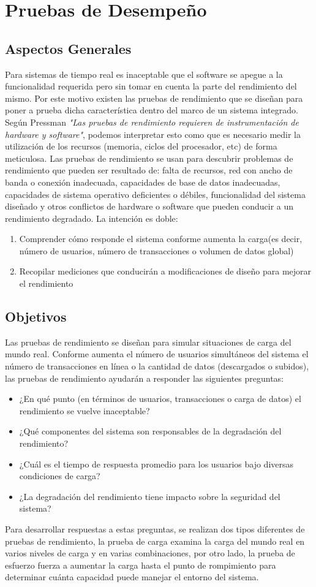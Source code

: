 \newpage
\chapter{Pruebas de Desempeño}
\section{Aspectos Generales}
\noindent
Para sistemas de tiempo real es inaceptable que el software se apegue a la funcionalidad requerida pero sin tomar en cuenta la parte del rendimiento del mismo. Por este motivo existen las pruebas de rendimiento que se diseñan para poner a prueba dicha característica dentro del marco de un sistema integrado. Según Pressman \cite{press} \textit{"Las pruebas de rendimiento requieren de instrumentación de hardware y software"}, podemos interpretar esto como que es necesario medir la utilización de los recursos (memoria, ciclos del procesador, etc) de forma meticulosa.
Las pruebas de rendimiento se usan para descubrir problemas de rendimiento que pueden ser resultado de: falta de recursos, red con ancho de banda o conexión inadecuada, capacidades de base de datos inadecuadas, capacidades de sistema operativo deficientes o débiles, funcionalidad del sistema diseñado y otros conflictos de hardware o software que pueden conducir a un rendimiento degradado. La intención es doble:
\begin{enumerate}
    \item Comprender cómo responde el sistema conforme aumenta la carga(es decir, número de usuarios, número de transacciones o volumen de datos global)
    \item Recopilar mediciones que conducirán a 
modificaciones de diseño para mejorar el rendimiento
\end{enumerate}
\section{Objetivos}
\noindent
Las pruebas de rendimiento se diseñan para simular situaciones de carga del mundo real. Conforme aumenta el número de usuarios simultáneos del sistema el número de transacciones en línea o la cantidad de datos (descargados o subidos), las pruebas de rendimiento ayudarán a responder las siguientes preguntas:
\begin{itemize}
    \item ¿En qué punto (en términos de usuarios, transacciones o carga de datos) el rendimiento 
se vuelve inaceptable?
    \item ¿Qué componentes del sistema son responsables de la degradación del rendimiento?
    \item ¿Cuál es el tiempo de respuesta promedio para los usuarios bajo diversas condiciones de 
carga?
    \item ¿La degradación del rendimiento tiene impacto sobre la seguridad del sistema?
\end{itemize}
Para desarrollar respuestas a estas preguntas, se realizan dos tipos diferentes de pruebas de rendimiento, la prueba de carga examina la carga del mundo real en varios niveles de carga y en varias combinaciones, por otro lado, la prueba de esfuerzo fuerza a aumentar la carga hasta el punto de rompimiento para determinar cuánta capacidad puede manejar el entorno del sistema.

